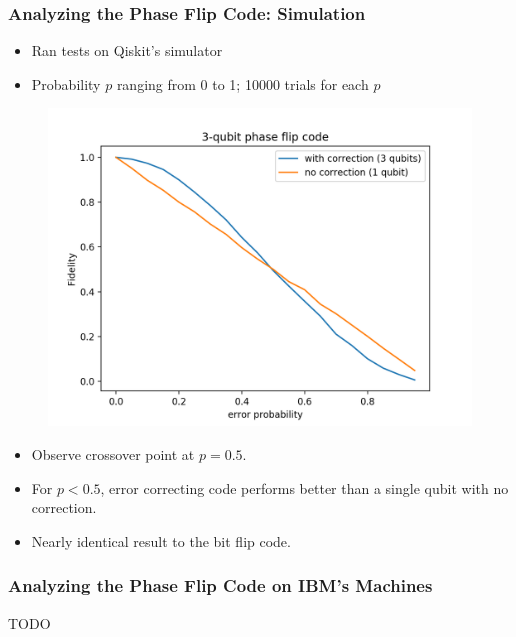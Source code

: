 \documentclass{beamer}
\begin{document}
\begin{frame}
    \frametitle{Analyzing the Phase Flip Code: Simulation}
    \begin{itemize}
        \item Ran tests on Qiskit's simulator
        \item Probability $p$ ranging from 0 to 1; 10000 trials for each $p$
        
        
    \end{itemize}
    \begin{minipage}{0.45\textwidth}
        \begin{figure}[H]
        \includegraphics[scale=0.4]{3qb-pf-overlay.png}
        \end{figure}
        \end{minipage} \hfill
        \begin{minipage}{0.45\textwidth}
        \begin{itemize}
        \item Observe crossover point at $p=0.5$.
        \item For $p<0.5$, error correcting code performs better than a single qubit with no correction.
        \item Nearly identical result to the bit flip code.
        \end{itemize}
    \end{minipage}
\end{frame}

\begin{frame}
    \frametitle{Analyzing the Phase Flip Code on IBM's Machines}
   
    TODO
    
\end{frame}
\end{document}

